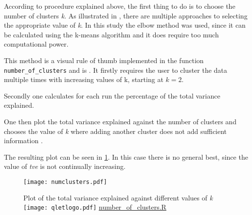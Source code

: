 According to procedure explained above, the first thing to do is to choose the number of clusters \textit{k}. As illustrated in \cite{kodinariya2013review}, there are multiple approaches to selecting the appropriate value of \textit{k}. In this study the elbow method was used, since it can be calculated using the k-means algorithm and it does require too much computational power.

This method is a visual rule of thumb implemented in the function \texttt{number\_of\_clusters} and is \cite{madhulatha2012overview}. It firstly requires the user to cluster the data multiple times with increasing values of k, starting at $k = 2$.



Secondly one calculates for each run the percentage of the total variance explained. 



One then plot the total variance explained against the number of clusters and chooses the value of \textit{k} where adding another cluster does not add sufficient information \citep{madhulatha2012overview}.



The resulting plot can be seen in \ref{figure:numclusterplot}. In this case there is no general best, since the value of \textit{tve} is not continually increasing.

\begin{figure}[H]
\begin{center}
\texttt{[image: numclusters.pdf]} \\
\caption{Plot of the total variance explained against different values of \textit{k} \protect\texttt{[image: qletlogo.pdf]} {\href{https://github.com/silvia-ventoruzzo/SPL-WISE-2018/blob/master/Helpers/number_of_clusters.R}{number\_of\_clusters.R}}}
\label{figure:numclusterplot}
\end{center}
\end{figure}

